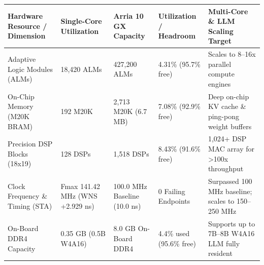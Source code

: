\documentclass[11pt,a4paper]{article}
\begin{document}
{\footnotesize\renewcommand{\arraystretch}{1.14}\begin{longtable}{@{}L{0.21\textwidth}L{0.16\textwidth}L{0.16\textwidth}L{0.15\textwidth}L{0.22\textwidth}@{}}\toprule

\textbf{Hardware Resource /\allowbreak{} Dimension} & \textbf{Single-Core Utilization} & \textbf{Arria 10 GX Capacity} & \textbf{Utilization /\allowbreak{} Headroom} & \textbf{Multi-Core \& LLM Scaling Target}\\\midrule\endhead

Adaptive Logic Modules (\allowbreak{}ALMs)\allowbreak{} & 18,\allowbreak{}420 ALMs & 427,\allowbreak{}200 ALMs & 4.31\% (\allowbreak{}95.7\% free)\allowbreak{} & Scales to 8--16x parallel compute engines\\[2pt]

On-Chip Memory (\allowbreak{}M20K BRAM)\allowbreak{} & 192 M20K & 2,\allowbreak{}713 M20K (\allowbreak{}6.7 MB)\allowbreak{} & 7.08\% (\allowbreak{}92.9\% free)\allowbreak{} & Deep on-chip KV cache \& ping-pong weight buffers\\[2pt]

Precision DSP Blocks (\allowbreak{}18x19)\allowbreak{} & 128 DSPs & 1,\allowbreak{}518 DSPs & 8.43\% (\allowbreak{}91.6\% free)\allowbreak{} & 1,\allowbreak{}024+\allowbreak{} DSP MAC array for >100x throughput\\[2pt]

Clock Frequency \& Timing (\allowbreak{}STA)\allowbreak{} & Fmax 141.42 MHz (\allowbreak{}WNS +\allowbreak{}2.929 ns)\allowbreak{} & 100.0 MHz Baseline (\allowbreak{}10.0 ns)\allowbreak{} & 0 Failing Endpoints & Surpassed 100 MHz baseline; scales to 150--250 MHz\\[2pt]

On-Board DDR4 Capacity & 0.35 GB (\allowbreak{}0.5B W4A16)\allowbreak{} & 8.0 GB On-Board DDR4 & 4.4\% used (\allowbreak{}95.6\% free)\allowbreak{} & Supports up to 7B--8B W4A16 LLM fully resident\\[2pt]

\bottomrule\end{longtable}}
\end{document}
